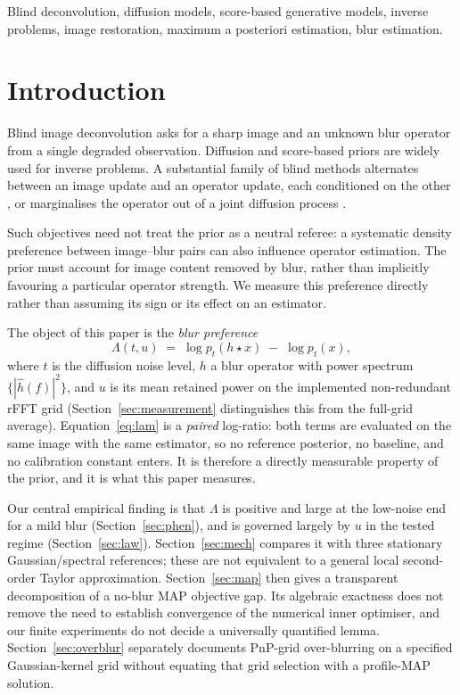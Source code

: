 \documentclass[10pt,journal]{IEEEtran}
\newcommand{\blur}{\star}
\newcommand{\Lam}{\Lambda}
\begin{document}
\begin{IEEEkeywords}
Blind deconvolution, diffusion models, score-based generative models, inverse problems,
image restoration, maximum a posteriori estimation, blur estimation.
\end{IEEEkeywords}

\section{Introduction}
\label{sec:intro}

Blind image deconvolution asks for a sharp image and an unknown blur operator from a single
degraded observation. Diffusion and score-based priors
\cite{ho2020ddpm,song2021score,nichol2021improved,song2020improved} are widely used for
inverse problems. A substantial family of blind methods alternates
between an image update and an operator update, each conditioned on the other
\cite{chung2023bdm,murata2023gibbsddrm,laroche2024fastdiffusionem,bai2026ladibi}, or
marginalises the operator out of a joint diffusion process
\cite{song2023resample,wang2022ddsm,kawar2022ddrm}.

Such objectives need not treat the prior as a neutral referee: a systematic density preference
between image--blur pairs can also influence operator estimation. The prior must account for
image content removed by blur, rather than implicitly favouring a particular operator strength.
We measure this preference directly rather than assuming its sign or its effect on an estimator.

The object of this paper is the
\emph{blur preference}
\begin{equation}
  \Lam(t,u) \;=\; \log p_t(h\blur x) \;-\; \log p_t(x),
  \label{eq:lam}
\end{equation}
where $t$ is the diffusion noise level, $h$ a blur operator with power spectrum
$\{|\hat h(f)|^2\}$, and $u$ is its mean retained power on the implemented non-redundant
rFFT grid (Section~\ref{sec:measurement} distinguishes this from the full-grid average).
Equation~\eqref{eq:lam} is a \emph{paired} log-ratio: both terms are evaluated
on the same image with the same estimator, so no reference posterior, no baseline, and no
calibration constant enters. It is therefore a directly measurable property of the prior, and it
is what this paper measures.

Our central empirical finding is that $\Lam$ is positive and large at the low-noise end for a
mild blur (Section~\ref{sec:phen}), and is governed largely by $u$ in the tested regime
(Section~\ref{sec:law}). Section~\ref{sec:mech} compares it with three stationary
Gaussian/spectral references; these are not equivalent to a general local second-order Taylor
approximation. Section~\ref{sec:map} then gives a transparent decomposition of a no-blur MAP
objective gap. Its algebraic exactness does not remove the need to establish convergence of the
numerical inner optimiser, and our finite experiments do not decide a universally quantified
lemma. Section~\ref{sec:overblur} separately documents PnP-grid over-blurring on a specified
Gaussian-kernel grid without equating that grid selection with a profile-MAP solution.
\end{document}
